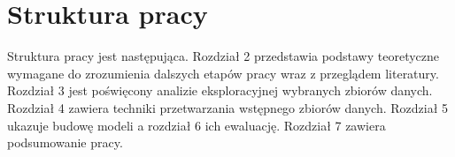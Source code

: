 \section{Struktura pracy}

Struktura pracy jest następująca. Rozdział 2 przedstawia podstawy teoretyczne wymagane do zrozumienia dalszych etapów pracy wraz z przeglądem literatury. Rozdział 3 jest poświęcony analizie eksploracyjnej wybranych zbiorów danych. Rozdział 4 zawiera techniki przetwarzania wstępnego zbiorów danych. Rozdział 5 ukazuje budowę modeli a rozdział 6 ich ewaluację. Rozdział 7 zawiera podsumowanie pracy.
